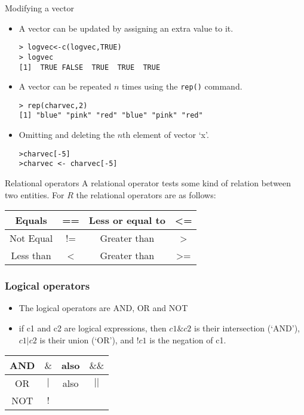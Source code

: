 \begin{frame}[fragile]{Modifying a vector}

\begin{itemize}
\item A vector can be updated by assigning an extra value to it.
\begin{verbatim}
> logvec<-c(logvec,TRUE)
> logvec
[1]  TRUE FALSE  TRUE  TRUE  TRUE
\end{verbatim}

\item A vector can be repeated $n$ times using the \texttt{rep()} command.
\begin{verbatim}
> rep(charvec,2)
[1] "blue" "pink" "red" "blue" "pink" "red"
\end{verbatim}

\item Omitting and deleting the $n$th element of vector `x'.
\begin{verbatim}
>charvec[-5]
>charvec <- charvec[-5]
\end{verbatim}

\end{itemize}
\end{frame}
\begin{frame}[fragile]{Relational operators}
A relational operator tests some kind of relation between two
entities. For $R$ the relational operators are as follows:
\begin{center}
\begin{tabular}{|c|c|c|c|}
  \hline

  Equals & == & Less or equal to  & <= \\
  \hline
  Not Equal & != & Greater than & > \\
  \hline
  Less than & < & Greater than & >= \\
  \hline
\end{tabular}
\end{center}
\end{frame}
\begin{frame}[fragile]
\frametitle{Logical operators}
\begin{itemize}
\item The logical operators are AND, OR and NOT

\item if c1 and c2 are logical expressions, then $c1 \& c2$ is
their intersection (`AND'), $c1 | c2$ is their union (`OR'), and
$!c1$ is the negation of c1.
\end{itemize}
\begin{center}
\begin{tabular}{|c|c|c|c|}
  \hline
  AND & $ \& $ & also  & $\&\&$ \\
  \hline
  OR & $|$ & also & $||$ \\
  \hline
  NOT & $!$ & &  \\
  \hline
\end{tabular}
\end{center}
\end{frame}
